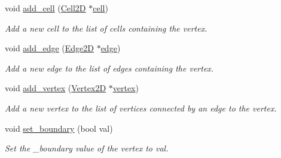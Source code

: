\begin{DoxyCompactItemize}
\mbox{\label{classMeshFramework2D_1_1Vertex2D_ae2b51139ae320115c0a732cb68dd5d91}} 
void \hyperlink{classMeshFramework2D_1_1Vertex2D_ae2b51139ae320115c0a732cb68dd5d91}{add\+\_\+cell} (\hyperlink{classMeshFramework2D_1_1Cell2D}{Cell2D} $\ast$\hyperlink{classMeshFramework2D_1_1Vertex2D_ad5eb7914636eb9937f84370c6030aed9}{cell})
\begin{DoxyCompactList}\small\item\em Add a new cell to the list of cells containing the vertex. \end{DoxyCompactList}\item 
\mbox{\label{classMeshFramework2D_1_1Vertex2D_a99d9e89fc5a01f960ca48179137dbd2f}} 
void \hyperlink{classMeshFramework2D_1_1Vertex2D_a99d9e89fc5a01f960ca48179137dbd2f}{add\+\_\+edge} (\hyperlink{classMeshFramework2D_1_1Edge2D}{Edge2D} $\ast$\hyperlink{classMeshFramework2D_1_1Vertex2D_afebfae577ee499d5309ff6a3981279de}{edge})
\begin{DoxyCompactList}\small\item\em Add a new edge to the list of edges containing the vertex. \end{DoxyCompactList}\item 
\mbox{\label{classMeshFramework2D_1_1Vertex2D_a44556af3aa22a09d2442fb87833085af}} 
void \hyperlink{classMeshFramework2D_1_1Vertex2D_a44556af3aa22a09d2442fb87833085af}{add\+\_\+vertex} (\hyperlink{classMeshFramework2D_1_1Vertex2D}{Vertex2D} $\ast$\hyperlink{classMeshFramework2D_1_1Vertex2D_a2094c42a5fe6dc9fa3b91cb90746eeb9}{vertex})
\begin{DoxyCompactList}\small\item\em Add a new vertex to the list of vertices connected by an edge to the vertex. \end{DoxyCompactList}\item 
\mbox{\label{classMeshFramework2D_1_1Vertex2D_a605706aa9e02bfc556a99c72eaf3e454}} 
void \hyperlink{classMeshFramework2D_1_1Vertex2D_a605706aa9e02bfc556a99c72eaf3e454}{set\+\_\+boundary} (bool val)
\begin{DoxyCompactList}\small\item\em Set the \+\_\+boundary value of the vertex to val. \end{DoxyCompactList}\end{DoxyCompactItemize}


